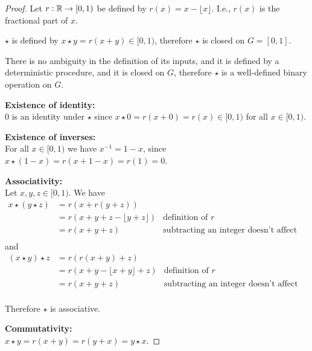 \begin{proof}
  Let $r: \mathbb{R} \to [0, 1)$ be defined by $r(x) = x - \lfloor x \rfloor$. I.e., $r(x)$ is the fractional part of $x$.

  $\star$ is defined by $x \star y = r(x + y) \in [0, 1)$, therefore $\star$ is closed on $G = [0, 1]$.

  There is no ambiguity in the definition of its inputs, and it is defined by a deterministic
  procedure, and it is closed on $G$, therefore $\star$ is a well-defined binary operation on $G$.

  {\bf Existence of identity:}\\
  $0$ is an identity under $\star$ since $x \star 0 = r(x + 0) = r(x) \in [0, 1)$ for all $x \in [0, 1)$.

  {\bf Existence of inverses:}\\
  For all $x \in [0, 1)$ we have $x^{-1} = 1 - x$, since $x \star (1 - x) = r(x + 1 - x) = r(1) = 0$.

  {\bf Associativity:}\\
  Let $x, y, z \in [0, 1)$. We have
  \begin{align*}
    x \star (y \star z)
    &= r(x + r(y + z)) \\
    &= r(x + y + z - \lfloor y + z \rfloor) &\text{definition of $r$}\\
    &= r(x + y + z)                         &\text{subtracting an integer doesn't affect fractional part}\\
  \end{align*}
  and
\begin{align*}
  (x \star y) \star z
  &= r(r(x + y) + z) \\
  &= r(x + y - \lfloor x + y \rfloor + z)    &\text{definition of $r$}\\
  &= r(x + y + z)                            &\text{subtracting an integer doesn't affect fractional part}\\
\end{align*}

Therefore $\star$ is associative.

  {\bf Commutativity:}\\
  $x \star y = r(x + y) = r(y + x) = y \star x$.
\end{proof}

